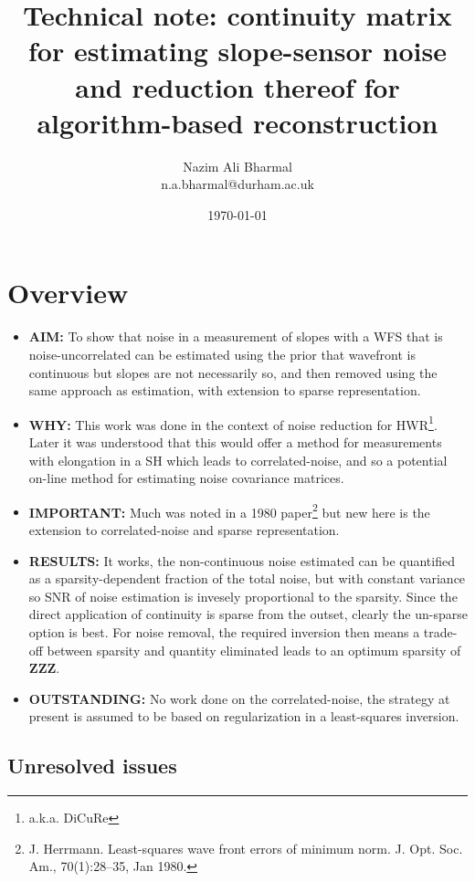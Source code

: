 \documentclass[a4paper]{article}
\title{Technical note: continuity matrix for estimating slope-sensor 
noise and reduction thereof for algorithm-based reconstruction}
\author{Nazim Ali Bharmal\\
n.a.bharmal@durham.ac.uk}
\date{\today}
\begin{document}
\maketitle

\section{Overview}

\begin{itemize}
   \item {\bf AIM:} To show that noise in a measurement of slopes with a WFS
   that is noise-uncorrelated can be estimated using the prior that wavefront
   is continuous but slopes are not necessarily so, and then removed using the
   same approach as estimation, with extension to sparse representation.

   \item {\bf WHY:} This work was done in the context of noise reduction for
   HWR\footnote{a.k.a. DiCuRe}. Later it was understood that this would offer a
   method for measurements with elongation in a SH which leads to
   correlated-noise, and so a potential on-line method for estimating noise
   covariance matrices.
   
   \item {\bf IMPORTANT:} Much was noted in a 1980 paper\footnote{J. Herrmann.
   Least-squares wave front errors of minimum norm. J. Opt. Soc. Am.,
   70(1):28–35, Jan 1980.} but new here is the extension to correlated-noise and
   sparse representation.

   \item {\bf RESULTS:} It works, the non-continuous noise estimated can be
   quantified as a sparsity-dependent fraction of the total noise, but with
   constant variance so SNR of noise estimation is invesely proportional
   to the sparsity. Since the direct application of continuity is sparse
   from the outset, clearly the un-sparse option is best.
   For noise removal, the required inversion then means a trade-off between
   sparsity and quantity eliminated leads to an optimum sparsity of {\bf ZZZ}.

   \item {\bf OUTSTANDING:} No work done on the correlated-noise, the strategy
   at present is assumed to be based on regularization in a least-squares
   inversion.
\end{itemize}

\subsection{Unresolved issues}
\end{document}
